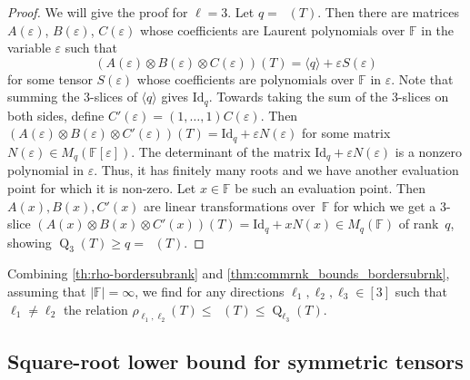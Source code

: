 \documentclass{daj}
\DeclareMathOperator{\subrank}{Q}
\DeclareMathOperator{\bordersubrank}{\underline{Q}}
\newcommand{\FF}{\mathbb{F}}
\newcommand{\eps}{\varepsilon}
\newcommand{\id}{\mathrm{Id}}
\begin{document}
\begin{proof}
    We will give the proof for $\ell=3$.
    Let $q=\bordersubrank(T)$. Then there are matrices $A(\eps)$, $B(\eps)$, $C(\eps)$ whose coefficients are Laurent polynomials over $\FF$ in the variable $\eps$ %
    such that
    \[
    (A(\eps)\otimes B(\eps)\otimes C(\eps))(T)=\langle q\rangle+\eps S(\eps) %
    \]
    for some tensor $S(\eps)$ whose coefficients are polynomials over $\FF$ in $\eps$.
    Note that summing the 3-slices of $\langle q\rangle$ gives $\id_q$.
    Towards taking the sum of the 3-slices on both sides, define $C'(\eps) = (1,\ldots,1) C(\eps)$.
    Then
    $(A(\eps)\otimes B(\eps)\otimes C'(\eps))(T)=\id_q+\eps N(\eps)$ for some matrix $N(\eps)\in M_{q}(\FF[\eps])$. The determinant of the matrix $\id_q+\eps N(\eps)$ is a nonzero polynomial in $\eps$. %
    Thus, it has finitely many roots and we have another evaluation point for which it is non-zero. %
    Let $x\in\FF$ be such an evaluation point. Then $A(x),B(x),C'(x)$ are linear transformations over~$\FF$ for which we get a $3$-slice $(A(x)\otimes B(x)\otimes C'(x))(T)= \id_q +xN(x)\in M_q(\FF)$ of rank~$q$, showing $\subrank_3(T)\geq q=\bordersubrank(T)$.
\end{proof}

Combining \autoref{th:rho-bordersubrank} and \autoref{thm:commrnk_bounds_bordersubrnk}, assuming that $|\FF| = \infty$, 
we find for any directions ${\ell_1},{\ell_2},{\ell_3} \in [3]$ such that ${\ell_1}\neq {\ell_2}$ the relation
%
$\rho_{{\ell_1},{\ell_2}}(T) \leq \bordersubrank(T) \leq \subrank_{\ell_3}(T).$
%

%
%
%

%
%
%
%

%
%

%

\subsection{Square-root lower bound for symmetric tensors} \label{sub:sqrt-assub-equal-pivots}
\end{document}
